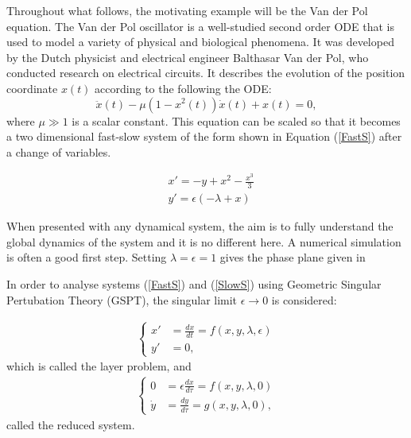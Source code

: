 Throughout what follows, the motivating example will be the Van der Pol equation. The Van der Pol oscillator is a well-studied second order ODE that is used to model a variety of physical and biological phenomena. It was developed by the Dutch physicist and electrical engineer Balthasar Van der Pol, who conducted research on electrical circuits. It describes the evolution of the position coordinate \(x(t)\) according to the following the ODE:
\begin{equation} \label{eq:vdP}
\ddot{x}(t)-\mu\left(1-x^2(t)\right)\dot{x}(t)+x(t)=0,
\end{equation}
where \(\mu \gg 1\) is a scalar constant. This equation can be scaled so that it becomes a two dimensional fast-slow system of the form shown in Equation (\ref{FastS}) after a change of variables.

\begin{equation}
\begin{aligned}
&x'=-y+x^2-\frac{x^3}{3} \\
&y'=\epsilon(-\lambda+x)
\end{aligned}
\label{eq: canonical}
\end{equation}

When presented with any dynamical system, the aim is to fully understand the global dynamics of the system and it is no different here. A numerical simulation is often a good first step. Setting $\lambda=\epsilon=1$ gives the phase plane given in 

\begin{figure}[h]
\end{figure}







In order to analyse systems (\ref{FastS}) and (\ref{SlowS}) using Geometric Singular Pertubation Theory (GSPT), the singular limit $\epsilon \to 0$ is considered:

\begin{align} \label{FastS0}
\begin{cases}
x' &=\frac{dx}{dt}= f(x,y,\lambda, \epsilon)\\
y' &= 0,
\end{cases}
\end{align}
which is called the layer problem, and
\begin{align}\label{SlowS0}
\begin{cases}
0 &= \epsilon \frac{dx}{d \tau} = f(x,y,\lambda, 0)\\
\dot{y} & = \frac{dy}{d \tau} =  g( x,y, \lambda,0),
\end{cases}
\end{align}
called the reduced system.\\


